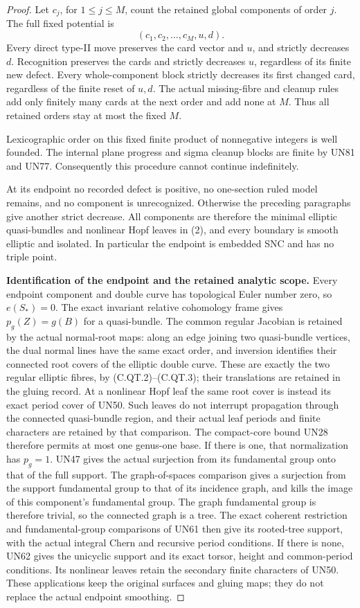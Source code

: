 \begin{proof}
Let \(c_j\), for \(1\le j\le M\), count
the retained global components of order \(j\).
The full fixed potential is
\[
                 (c_1,c_2,\ldots,c_M,u,d).
 \tag{C.GP.10}
\]
Every direct type-II move preserves the card
vector and \(u\), and strictly decreases \(d\).
Recognition preserves the cards and strictly
decreases \(u\), regardless of its finite
new defect. Every whole-component block
strictly decreases its first changed card,
regardless of the finite reset of \(u,d\).
The actual missing-fibre and cleanup rules
add only finitely many cards at the next
order and add none at \(M\). Thus all
retained orders stay at most the fixed \(M\).

Lexicographic order on this fixed finite
product of nonnegative integers is well
founded. The internal plane progress and
sigma cleanup blocks are finite by UN81
and UN77. Consequently this procedure
cannot continue indefinitely.

At its endpoint no recorded defect is
positive, no one-section ruled model
remains, and no component is unrecognized.
Otherwise the preceding paragraphs give
another strict decrease. All components
are therefore the minimal elliptic
quasi-bundles and nonlinear Hopf leaves
in (2), and every boundary is smooth
elliptic and isolated. In particular the
endpoint is embedded SNC and has no
triple point.

\par\medskip\noindent\textbf{Identification of the endpoint and the retained analytic scope.}
Every endpoint component and double curve
has topological Euler number zero, so
\(e(S_*)=0\). The exact invariant relative
cohomology frame gives
\(p_g(Z)=g(B)\) for a quasi-bundle. The
common regular Jacobian is retained by
the actual normal-root maps: along an
edge joining two quasi-bundle vertices,
the dual normal lines have the same
exact order, and inversion identifies
their connected root covers of the
elliptic double curve. These are exactly
the two regular elliptic fibres, by
(C.QT.2)--(C.QT.3); their translations
are retained in the gluing record.
At a nonlinear Hopf leaf the same root
cover is instead its exact period cover
of UN50. Such leaves do not interrupt
propagation through the connected
quasi-bundle region, and their actual
leaf periods and finite characters are
retained by that comparison.
The
compact-core bound UN28 therefore permits
at most one genus-one base. If there is
one, that normalization has \(p_g=1\).
UN47 gives the actual surjection from its
fundamental group onto that of the full
support. The graph-of-spaces comparison
gives a surjection from the support
fundamental group to that of its incidence
graph, and kills the image of this
component's fundamental group.
The graph fundamental group is therefore
trivial, so the connected graph is a tree.
The exact coherent restriction and
fundamental-group comparisons of UN61
then give its rooted-tree support, with the
actual integral Chern and recursive
period conditions. If there is none,
UN62 gives the unicyclic support and
its exact torsor, height and common-period
conditions. Its nonlinear leaves retain
the secondary finite characters of UN50.
These applications keep the original
surfaces and gluing maps; they do not
replace the actual endpoint smoothing.


\end{proof}
